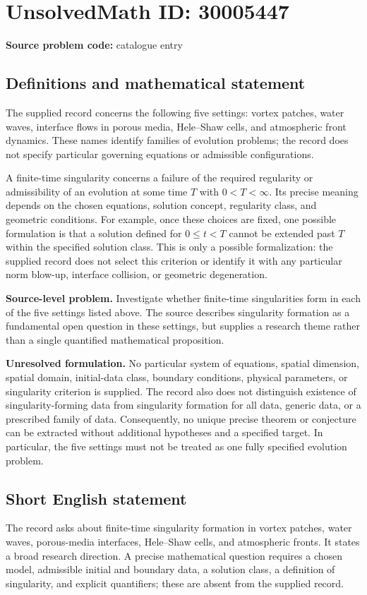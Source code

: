 \documentclass[11pt]{article}
\begin{document}
\section*{UnsolvedMath ID: 30005447}
\textbf{Source problem code:} catalogue entry
\subsection{Definitions and mathematical statement}
The supplied record concerns the following five settings: vortex patches, water waves, interface flows in porous media, Hele--Shaw cells, and atmospheric front dynamics. These names identify families of evolution problems; the record does not specify particular governing equations or admissible configurations.

A finite-time singularity concerns a failure of the required regularity or admissibility of an evolution at some time \(T\) with \(0<T<\infty\). Its precise meaning depends on the chosen equations, solution concept, regularity class, and geometric conditions. For example, once these choices are fixed, one possible formulation is that a solution defined for \(0\leq t<T\) cannot be extended past \(T\) within the specified solution class. This is only a possible formalization: the supplied record does not select this criterion or identify it with any particular norm blow-up, interface collision, or geometric degeneration.

\textbf{Source-level problem.} Investigate whether finite-time singularities form in each of the five settings listed above. The source describes singularity formation as a fundamental open question in these settings, but supplies a research theme rather than a single quantified mathematical proposition.

\textbf{Unresolved formulation.} No particular system of equations, spatial dimension, spatial domain, initial-data class, boundary conditions, physical parameters, or singularity criterion is supplied. The record also does not distinguish existence of singularity-forming data from singularity formation for all data, generic data, or a prescribed family of data. Consequently, no unique precise theorem or conjecture can be extracted without additional hypotheses and a specified target. In particular, the five settings must not be treated as one fully specified evolution problem.
\subsection{Short English statement}
The record asks about finite-time singularity formation in vortex patches, water waves, porous-media interfaces, Hele--Shaw cells, and atmospheric fronts. It states a broad research direction. A precise mathematical question requires a chosen model, admissible initial and boundary data, a solution class, a definition of singularity, and explicit quantifiers; these are absent from the supplied record.
\end{document}
